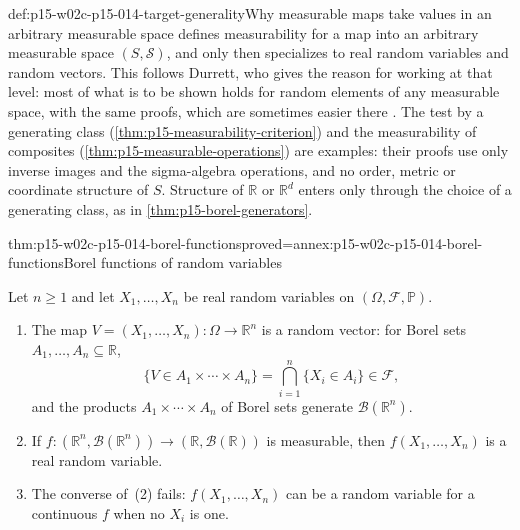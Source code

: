 \begin{hbconvention}{def:p15-w02c-p15-014-target-generality}{Why measurable maps take values in an arbitrary measurable space}
 defines measurability for a map into an
arbitrary measurable space \((S,\mathcal S)\), and only then specializes
to real random variables and random vectors. This follows Durrett, who
gives the reason for working at that level: most of what is to be shown
holds for random elements of any measurable space, with the same proofs,
which are sometimes easier there \cite[sec.~1.3, p.~15]{DurrettPTEAuthor2019}.
The test by a generating class
(\cref{thm:p15-measurability-criterion}) and the measurability of
composites (\cref{thm:p15-measurable-operations}) are examples: their
proofs use only inverse images and the sigma-algebra operations, and no
order, metric or coordinate structure of \(S\). Structure of
\(\mathbb R\) or \(\mathbb R^d\) enters only through the choice of a
generating class, as in \cref{thm:p15-borel-generators}.
\end{hbconvention}

\begin{hbcorollary}{thm:p15-w02c-p15-014-borel-functions}{proved=annex:p15-w02c-p15-014-borel-functions}{Borel functions of random variables}
\par\nobreak
Let \(n\geq1\) and let \(X_1,\ldots,X_n\) be real random variables on
\((\Omega,\mathcal F,\mathbb P)\).
\begin{enumerate}
\item The map \(V=(X_1,\ldots,X_n):\Omega\to\mathbb R^n\) is a random
      vector: for Borel sets \(A_1,\ldots,A_n\subseteq\mathbb R\),
      \[
       \{V\in A_1\times\cdots\times A_n\}=\bigcap_{i=1}^n\{X_i\in A_i\}
       \in\mathcal F,
      \]
      and the products \(A_1\times\cdots\times A_n\) of Borel sets
      generate \(\mathcal B(\mathbb R^n)\).
\item If \(f:(\mathbb R^n,\mathcal B(\mathbb R^n))\to
      (\mathbb R,\mathcal B(\mathbb R))\) is measurable, then
      \(f(X_1,\ldots,X_n)\) is a real random variable.
\item The converse of~(2) fails: \(f(X_1,\ldots,X_n)\) can be a random
      variable for a continuous \(f\) when no \(X_i\) is one.
\end{enumerate}
\end{hbcorollary}

